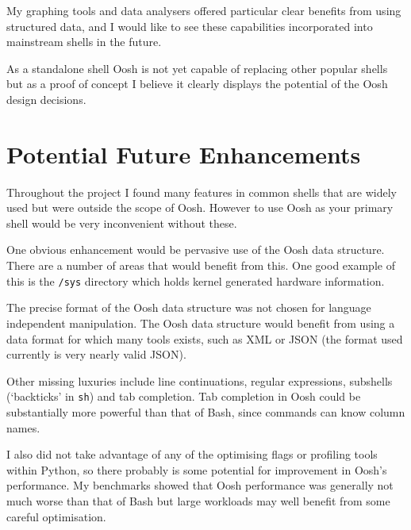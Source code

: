 \documentclass[12pt,twoside,notitlepage]{report}
\begin{document}
My graphing tools and data analysers offered particular clear benefits
from using structured data, and I would like to see these capabilities
incorporated into mainstream shells in the future.

As a standalone shell Oosh is not yet capable of replacing other
popular shells but as a proof of concept I believe it clearly displays
the potential of the Oosh design decisions.

\section{Potential Future Enhancements}
Throughout the project I found many features in common shells that are
widely used but were outside the scope of Oosh. However to use Oosh as
your primary shell would be very inconvenient without these.

One obvious enhancement would be pervasive use of the Oosh data
structure. There are a number of areas that would benefit from this.
One good example of this is the {\tt /sys} directory which holds
kernel generated hardware information. 

The precise format of the Oosh data structure was not chosen for
language independent manipulation. The Oosh data structure would
benefit from using a data format for which many tools exists, such as
XML or JSON (the format used currently is very nearly valid JSON).

Other missing luxuries include line continuations, regular
expressions, subshells (`backticks' in {\tt sh}) and tab completion. Tab
completion in Oosh could be substantially more powerful than that of
Bash, since commands can know column names.

I also did not take advantage of any of the optimising flags or
profiling tools within Python, so there probably is some potential for
improvement in Oosh's performance. My benchmarks showed that Oosh
performance was generally not much worse than that of Bash but large
workloads may well benefit from some careful optimisation.


\cleardoublepage

\end{document}

